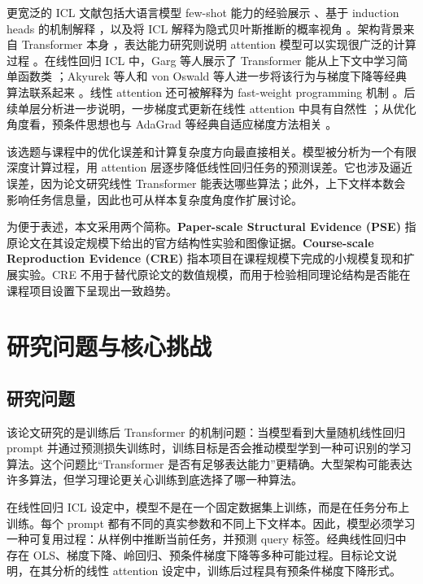 \documentclass[conference]{IEEEtran}
\begin{document}
更宽泛的 ICL 文献包括大语言模型 few-shot 能力的经验展示 \cite{brown2020language}、基于 induction heads 的机制解释 \cite{olsson2022context}，以及将 ICL 解释为隐式贝叶斯推断的概率视角 \cite{xie2022bayesian}。架构背景来自 Transformer 本身 \cite{vaswani2017attention}，表达能力研究则说明 attention 模型可以实现很广泛的计算过程 \cite{perez2021attention,wei2022statistically}。在线性回归 ICL 中，Garg 等人展示了 Transformer 能从上下文中学习简单函数类 \cite{garg2022can}；Akyurek 等人和 von Oswald 等人进一步将该行为与梯度下降等经典算法联系起来 \cite{akyurek2023learning,von2023transformers}。线性 attention 还可被解释为 fast-weight programming 机制 \cite{schlag2021linear}。后续单层分析进一步说明，一步梯度式更新在线性 attention 中具有自然性 \cite{mahankali2023one,zhang2023trained}；从优化角度看，预条件思想也与 AdaGrad 等经典自适应梯度方法相关 \cite{duchi2011adaptive}。

该选题与课程中的优化误差和计算复杂度方向最直接相关。模型被分析为一个有限深度计算过程，用 attention 层逐步降低线性回归任务的预测误差。它也涉及逼近误差，因为论文研究线性 Transformer 能表达哪些算法；此外，上下文样本数会影响任务信息量，因此也可从样本复杂度角度作扩展讨论。

为便于表述，本文采用两个简称。\textbf{Paper-scale Structural Evidence (PSE)} 指原论文在其设定规模下给出的官方结构性实验和图像证据。\textbf{Course-scale Reproduction Evidence (CRE)} 指本项目在课程规模下完成的小规模复现和扩展实验。CRE 不用于替代原论文的数值规模，而用于检验相同理论结构是否能在课程项目设置下呈现出一致趋势。

\section{研究问题与核心挑战}
\subsection{研究问题}
该论文研究的是训练后 Transformer 的机制问题：当模型看到大量随机线性回归 prompt 并通过预测损失训练时，训练目标是否会推动模型学到一种可识别的学习算法。这个问题比“Transformer 是否有足够表达能力”更精确。大型架构可能表达许多算法，但学习理论更关心训练到底选择了哪一种算法。

在线性回归 ICL 设定中，模型不是在一个固定数据集上训练，而是在任务分布上训练。每个 prompt 都有不同的真实参数和不同上下文样本。因此，模型必须学习一种可复用过程：从样例中推断当前任务，并预测 query 标签。经典线性回归中存在 OLS、梯度下降、岭回归、预条件梯度下降等多种可能过程。目标论文说明，在其分析的线性 attention 设定中，训练后过程具有预条件梯度下降形式。
\end{document}
